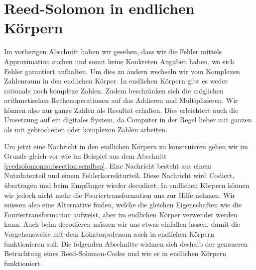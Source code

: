 %
%
%
\section{Reed-Solomon in endlichen Körpern
\label{reedsolomon:section:endlichekoerper}}
Im vorherigen Abschnitt haben wir gesehen, dass wir die Fehler mittels Approximation suchen und somit keine Konkreten Angaben haben, wo sich Fehler garantiert aufhalten. 
Um dies zu ändern wechseln wir vom Komplexen Zahlenraum in den endlichen Körper.
In endlichen Körpern gibt es weder rationale noch komplexe Zahlen. 
Zudem beschränken sich die möglichen arithmetischen Rechenoperationen auf das Addieren und Multiplizieren. 
Wir können also nur ganze Zahlen als Resultat erhalten.
Dies erleichtert auch die Umsetzung auf ein digitales System, da Computer in der Regel lieber mit ganzen als mit gebrochenen oder komplexen Zahlen arbeiten. 

Um jetzt eine Nachricht in den endlichen Körpern zu konstruieren gehen wir im Grunde gleich vor wie im Beispiel aus dem Abschnitt \ref{reedsolomon:subsection:sendbsp}.
Eine Nachricht besteht aus einem Nutzdatenteil und einem Fehlerkorrekturteil. 
Diese Nachricht wird Codiert, übertragen und beim Empfänger wieder decodiert. 
In endlichen Körpern können wir jedoch nicht mehr die Fouriertransformation uns zur Hilfe nehmen.
Wir müssen also eine Alternative finden, welche die gleichen Eigenschaften wie die Fouriertransformation aufweist, aber im endlichen Körper verwendet werden kann.
Auch beim decodieren müssen wir uns etwas einfallen lassen, damit die Vorgehensweise mit dem Lokatorpolynom auch in endlichen Körpern funktionieren soll. Die folgenden Abschnitte widmen sich deshalb der genaueren Betrachtung eines Reed-Solomon-Codes und wie er in endlichen Körpern funktioniert. 

